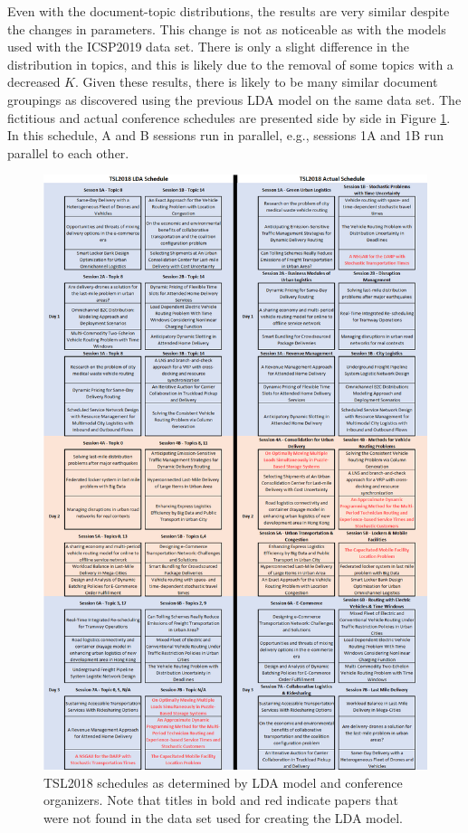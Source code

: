 \documentclass[a4paper, 12pt, twoside]{article}
\numberwithin{equation}{section} %
\begin{document}
Even with the document-topic distributions, the results are very similar despite the changes in parameters. This change is not as noticeable as with the models used with the ICSP2019 data set. There is only a slight difference in the distribution in topics, and this is likely due to the removal of some topics with a decreased $K$. Given these results, there is likely to be many similar document groupings as discovered using the previous LDA model on the same data set. The fictitious and actual conference schedules are presented side by side in Figure \ref{fig:TSL2018 schedules}. In this schedule, A and B sessions run in parallel, e.g., sessions 1A and 1B run parallel to each other.



\begin{figure}[H]

  \centering
  \includegraphics[scale=0.5]{TSL_schedules.png}
\caption[Fictitious conference and actual conference plan for TSL2018]{TSL2018 schedules as determined by LDA model and conference organizers. Note that titles in bold and red indicate papers that were not found in the data set used for creating the LDA model.}
\label{fig:TSL2018 schedules}
\end{figure}
\end{document}
